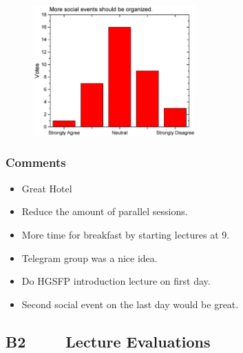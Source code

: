 \begin{figure}[H]
\begin{minipage}{.48\linewidth}
      {\includegraphics[height=50mm]{figures/n/Graph20.pdf}}
  \end{minipage}
\end{figure}
\subsubsection*{Comments}
\begin{itemize}
\item Great Hotel
\item Reduce the amount of parallel sessions.
\item More time for breakfast by starting lectures at 9.
\item Telegram group was a nice idea.
\item Do HGSFP introduction lecture on first day.
\item Second social event on the last day would be great.
\end{itemize}

\clearpage
\subsection*{B2 $\qquad$ Lecture Evaluations}

